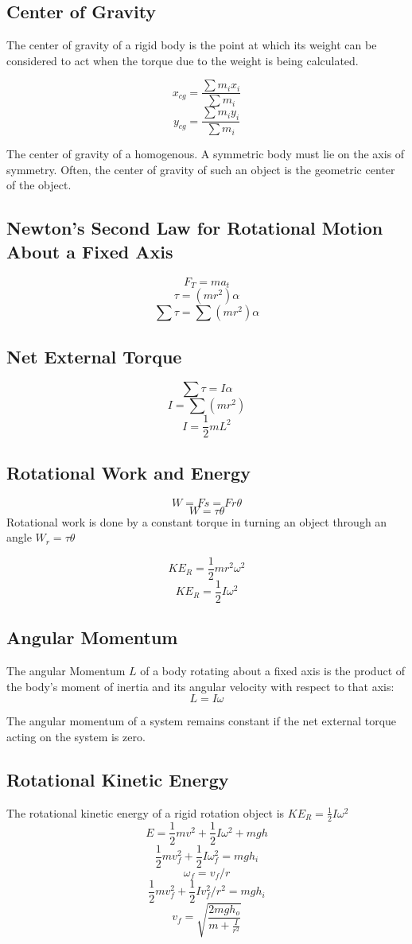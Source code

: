 \subsection{Center of Gravity}
The center of gravity of a rigid body is the point at which its weight can be considered to act when the torque due to the weight is being calculated. 

\[x_{cg}=\frac{\sum m_ix_i}{\sum m_i}\]
\[y_{cg}=\frac{\sum m_iy_i}{\sum m_i}\]

The center of gravity of a homogenous. A symmetric body must lie on the axis of symmetry. Often, the center of gravity of such an object is the geometric center of the object. 

\subsection{Newton’s Second Law for Rotational Motion About a Fixed Axis}
\[F_T=ma_t\]
\[\tau=(mr^2)\alpha\]
\[\sum\tau=\sum(mr^2)\alpha\]

\subsection{Net External Torque}
\[\sum\tau=I\alpha\]
\[I=\sum(mr^2)\]
\[I=\frac{1}{2}mL^2\]

\subsection{Rotational Work and Energy}
\[W=Fs=Fr\theta\]
\[W=\tau\theta\]
Rotational work is done by a constant torque in turning an object through an angle $W_r=\tau\theta$

\[KE_R=\frac{1}{2}mr^2\omega^2\]
\[KE_R=\frac{1}{2}I\omega^2\]

\subsection{Angular Momentum}
The angular Momentum $L$ of a body rotating about a fixed axis is the product of the body's moment of inertia and its angular velocity with respect to that axis: \[L=I\omega\]

The angular momentum of a system remains constant if the net external torque acting on the system is zero. 

\subsection{Rotational Kinetic Energy}
The rotational kinetic energy of a rigid rotation object is $KE_R=\frac{1}{2}I\omega^2$
\[E=\frac{1}{2}mv^2+\frac{1}{2}I\omega^2+mgh\]
\[\frac{1}{2}mv_f^2+\frac{1}{2}I\omega^2_f=mgh_i\]
\[\omega _f=v_f/r\]
\[\frac{1}{2}mv^2_f+\frac{1}{2}Iv^2_f/r^2=mgh_i\]
\[v_f=\sqrt{\frac{2mgh_o}{m+\frac{I}{r^2}}}\]